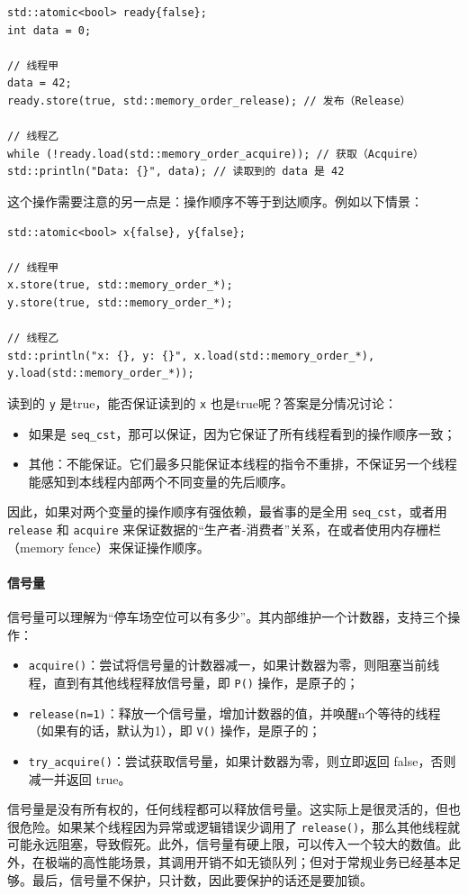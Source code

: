 \begin{verbatim}
std::atomic<bool> ready{false};
int data = 0;

// 线程甲
data = 42;       
ready.store(true, std::memory_order_release); // 发布（Release）

// 线程乙
while (!ready.load(std::memory_order_acquire)); // 获取（Acquire）
std::println("Data: {}", data); // 读取到的 data 是 42
\end{verbatim}

这个操作需要注意的另一点是：操作顺序不等于到达顺序。例如以下情景：
\begin{verbatim}
std::atomic<bool> x{false}, y{false};

// 线程甲
x.store(true, std::memory_order_*);
y.store(true, std::memory_order_*);

// 线程乙
std::println("x: {}, y: {}", x.load(std::memory_order_*), y.load(std::memory_order_*));
\end{verbatim}
读到的 \verb|y| 是true，能否保证读到的 \verb|x| 也是true呢？答案是分情况讨论：
\begin{itemize}
    \item 如果是 \verb|seq_cst|，那可以保证，因为它保证了所有线程看到的操作顺序一致；
    \item 其他：不能保证。它们最多只能保证本线程的指令不重排，不保证另一个线程能感知到本线程内部两个不同变量的先后顺序。
\end{itemize}
因此，如果对两个变量的操作顺序有强依赖，最省事的是全用 \verb|seq_cst|，或者用 \verb|release| 和 \verb|acquire| 来保证数据的“生产者-消费者”关系，在或者使用内存栅栏（memory fence）来保证操作顺序。

\paragraph{信号量} 信号量可以理解为“停车场空位可以有多少”。其内部维护一个计数器，支持三个操作：
\begin{itemize}
    \item \verb|acquire()|：尝试将信号量的计数器减一，如果计数器为零，则阻塞当前线程，直到有其他线程释放信号量，即 \verb|P()| 操作，是原子的；
    \item \verb|release(n=1)|：释放一个信号量，增加计数器的值，并唤醒n个等待的线程（如果有的话，默认为1），即 \verb|V()| 操作，是原子的；
    \item \verb|try_acquire()|：尝试获取信号量，如果计数器为零，则立即返回 false，否则减一并返回 true。
\end{itemize}
信号量是没有所有权的，任何线程都可以释放信号量。这实际上是很灵活的，但也很危险。如果某个线程因为异常或逻辑错误少调用了 \verb|release()|，那么其他线程就可能永远阻塞，导致假死。此外，信号量有硬上限，可以传入一个较大的数值。此外，在极端的高性能场景，其调用开销不如无锁队列；但对于常规业务已经基本足够。最后，信号量不保护，只计数，因此要保护的话还是要加锁。

